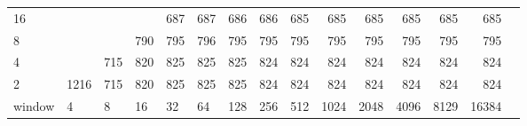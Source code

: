 \begin{table}[h]
{\begin{tabular}{lrrrrrrrrrrrrrr}
			\multicolumn{1}{|l|}{16} &  &  &  & \cellcolor[HTML]{E60000}687 & \cellcolor[HTML]{E60000}687 & \cellcolor[HTML]{E60000}686 & \cellcolor[HTML]{E60000}686 & \cellcolor[HTML]{E60000}685 & \cellcolor[HTML]{E60000}685 & \cellcolor[HTML]{E60000}685 & \cellcolor[HTML]{E60000}685 & \cellcolor[HTML]{E60000}685 & \cellcolor[HTML]{E60000}685 \\ \cline{1-1}
			\multicolumn{1}{|l|}{8} &  &  & \cellcolor[HTML]{E60000}790 & \cellcolor[HTML]{E60000}795 & \cellcolor[HTML]{E60000}796 & \cellcolor[HTML]{E60000}795 & \cellcolor[HTML]{E60000}795 & \cellcolor[HTML]{E60000}795 & \cellcolor[HTML]{E60000}795 & \cellcolor[HTML]{E60000}795 & \cellcolor[HTML]{E60000}795 & \cellcolor[HTML]{E60000}795 & \cellcolor[HTML]{E60000}795 \\ \cline{1-1}
			\multicolumn{1}{|l|}{4} &  & \cellcolor[HTML]{E60000}715 & \cellcolor[HTML]{9900E6}820 & \cellcolor[HTML]{9900E6}825 & \cellcolor[HTML]{9900E6}825 & \cellcolor[HTML]{9900E6}825 & \cellcolor[HTML]{9900E6}824 & \cellcolor[HTML]{9900E6}824 & \cellcolor[HTML]{9900E6}824 & \cellcolor[HTML]{9900E6}824 & \cellcolor[HTML]{9900E6}824 & \cellcolor[HTML]{9900E6}824 & \cellcolor[HTML]{9900E6}824 \\ \cline{1-1}
			\multicolumn{1}{|l|}{2} & \cellcolor[HTML]{4C00E6}1216 & \cellcolor[HTML]{E60000}715 & \cellcolor[HTML]{9900E6}820 & \cellcolor[HTML]{9900E6}825 & \cellcolor[HTML]{9900E6}825 & \cellcolor[HTML]{9900E6}825 & \cellcolor[HTML]{9900E6}824 & \cellcolor[HTML]{9900E6}824 & \cellcolor[HTML]{9900E6}824 & \cellcolor[HTML]{9900E6}824 & \cellcolor[HTML]{9900E6}824 & \cellcolor[HTML]{9900E6}824 & \cellcolor[HTML]{9900E6}824 \\ \hline
			\multicolumn{1}{l|}{window} & \multicolumn{1}{l|}{4} & \multicolumn{1}{l|}{8} & \multicolumn{1}{l|}{16} & \multicolumn{1}{l|}{32} & \multicolumn{1}{l|}{64} & \multicolumn{1}{l|}{128} & \multicolumn{1}{l|}{256} & \multicolumn{1}{l|}{512} & \multicolumn{1}{l|}{1024} & \multicolumn{1}{l|}{2048} & \multicolumn{1}{l|}{4096} & \multicolumn{1}{l|}{8129} & \multicolumn{1}{l|}{16384} \\ \cline{2-14} 
		\end{tabular}
	}
\end{table}


